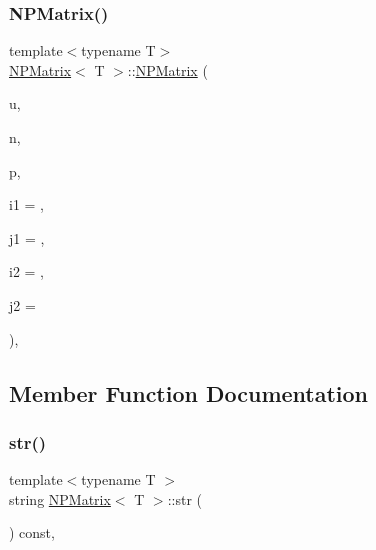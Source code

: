 \subsubsection{\texorpdfstring{NPMatrix()}{NPMatrix()}\hspace{0.1cm}{\footnotesize\ttfamily [7/7]}}
{\footnotesize\ttfamily template$<$typename T$>$ \\
\mbox{\hyperlink{class_n_p_matrix}{N\+P\+Matrix}}$<$ T $>$\+::\mbox{\hyperlink{class_n_p_matrix}{N\+P\+Matrix}} (\begin{DoxyParamCaption}\item[{const \mbox{\hyperlink{class_n_vector}{N\+Vector}}$<$ T $>$ \&}]{u,  }\item[{\mbox{\hyperlink{typedef_8h_a1b140a2034db3f5dfe18a987745df43a}{ul\+\_\+t}}}]{n,  }\item[{\mbox{\hyperlink{typedef_8h_a1b140a2034db3f5dfe18a987745df43a}{ul\+\_\+t}}}]{p,  }\item[{\mbox{\hyperlink{typedef_8h_a1b140a2034db3f5dfe18a987745df43a}{ul\+\_\+t}}}]{i1 = {},  }\item[{\mbox{\hyperlink{typedef_8h_a1b140a2034db3f5dfe18a987745df43a}{ul\+\_\+t}}}]{j1 = {},  }\item[{\mbox{\hyperlink{typedef_8h_a1b140a2034db3f5dfe18a987745df43a}{ul\+\_\+t}}}]{i2 = {},  }\item[{\mbox{\hyperlink{typedef_8h_a1b140a2034db3f5dfe18a987745df43a}{ul\+\_\+t}}}]{j2 = {} }\end{DoxyParamCaption})\hspace{0.3cm}{\ttfamily [explicit]}, {\ttfamily [protected]}}



\subsection{Member Function Documentation}
\mbox{\label{class_n_p_matrix_ac60d089a0a4b6d0a1df3cf549f50028d}} 
\subsubsection{\texorpdfstring{str()}{str()}}
{\footnotesize\ttfamily template$<$typename T $>$ \\
string \mbox{\hyperlink{class_n_p_matrix}{N\+P\+Matrix}}$<$ T $>$\+::str (\begin{DoxyParamCaption}{ }\end{DoxyParamCaption}) const\hspace{0.3cm}{\ttfamily [override]}, {\ttfamily [virtual]}}



